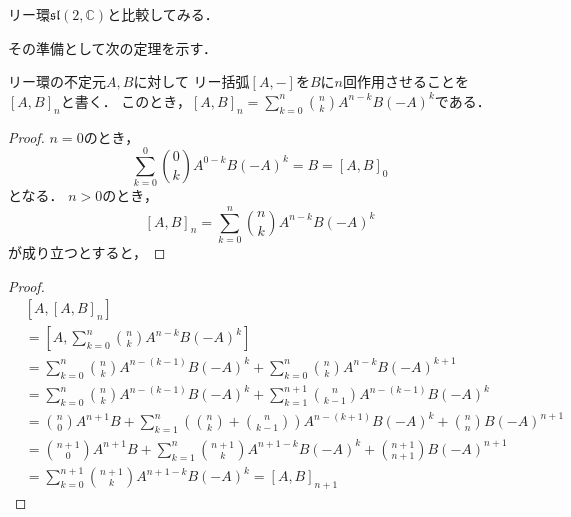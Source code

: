 \documentclass[10pt,dvipdfm]{beamer}
\newcommand{\CC}{\mathbb{C}}
\begin{document}
  \begin{frame}
    リー環$\mathfrak{sl}(2,\CC)$と比較してみる．

    その準備として次の定理を示す．
    \begin{theorem}
      リー環の不定元$A,B$に対して
      リー括弧$[A,-]$を$B$に$n$回作用させることを$[A,B]_n$と書く．
      このとき，$[A,B]_n=\sum_{k=0}^{n}\binom{n}{k}A^{n-k}B(-A)^k$である．
    \end{theorem}

  \end{frame}
  \begin{frame}
    \begin{proof}
      $n=0$のとき，
      \[
      \sum_{k=0}^{0}\binom{0}{k}A^{0-k}B(-A)^k = B = [A,B]_0
      \]
      となる．
      $n>0$のとき，
      \[
      [A,B]_n = \sum_{k=0}^{n}\binom{n}{k}A^{n-k}B(-A)^k
      \]
      が成り立つとすると，
      \let\qedsymbol\relax
    \end{proof}
  \end{frame}
  \begin{frame}
    \begin{proof}
      \begin{align*}
        &[A,[A,B]_n]\\ 
        &= [A,\sum_{k=0}^{n}\binom{n}{k}A^{n-k}B(-A)^k]\\
        &= \sum_{k=0}^{n}\binom{n}{k}A^{n-(k - 1)}B(-A)^k + \sum_{k=0}^{n}\binom{n}{k}A^{n-k}B(-A)^{k+1}\\
        &= \sum_{k=0}^{n}\binom{n}{k}A^{n-(k - 1)}B(-A)^k + \sum_{k=1}^{n+1}\binom{n}{k-1}A^{n-(k-1)}B(-A)^{k}\\
        &= \binom{n}{0} A^{n+1}B + \sum_{k=1}^{n}\left(\binom{n}{k}+\binom{n}{k-1}\right)A^{n-(k+1)}B(-A)^k + \binom{n}{n}B(-A)^{n+1}\\
        &= \binom{n+1}{0} A^{n+1}B + \sum_{k=1}^{n}\binom{n+1}{k}A^{n+1-k}B(-A)^k + \binom{n+1}{n+1}B(-A)^{n+1}\\
        &= \sum_{k=0}^{n+1}\binom{n+1}{k}A^{n+1-k}B(-A)^k = [A,B]_{n+1}
      \end{align*}
    \end{proof}
  \end{frame}
\end{document}
